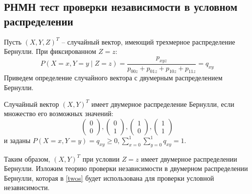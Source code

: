 \begin{center}
    \subsection{РНМН тест проверки независимости в условном
распределении}\label{bivariate_umpu}
\end{center}
     

Пусть $(X,Y,Z)^T$ -- случайный вектор, имеющий трехмерное распределение Бернулли.
При фиксированном $Z=z$:
$$
P(X=x,Y=y \mid Z=z) =
\dfrac{p_{xyz}}{p_{00z}+p_{01z}+p_{10z}+p_{11z}} = q_{xy}
$$
Приведем определение случайного вектора с двумерным распределением Бернулли.
\begin{definition}
    Случайный вектор $(X,Y)^T$ имеет двумерное распределение Бернулли,
    если множество его возможных значений:
    $$
        \begin{pmatrix}
            0 \\
            0
        \end{pmatrix},
        \begin{pmatrix}
            0 \\
            1
        \end{pmatrix},
        \begin{pmatrix}
            1 \\
            0
        \end{pmatrix},
        \begin{pmatrix}
            1 \\
            1
        \end{pmatrix}
    $$ и заданы $P(X=x,Y=y)=q_{xy} \geq 0,  \sum_{x=0}^1 \sum_{y=0}^1 q_{xy} =1$.
\end{definition}
Таким образом, $(X,Y)^T$ при условии $Z=z$ имеет двумерное распределении Бернулли.
Изложим теорию проверки независимости в двумерном распределении Бернулли,
которая в \autoref{twos} будет использована для проверки условной независимости.

